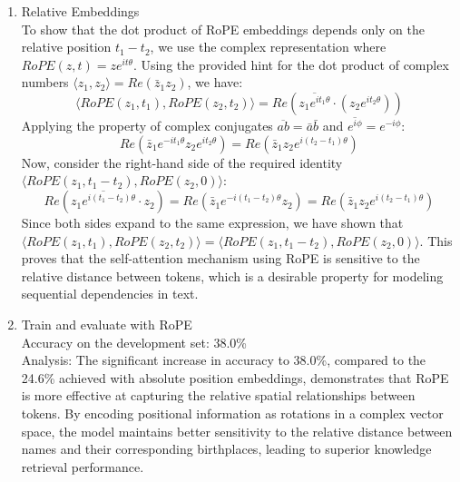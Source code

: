 \documentclass{article}
\begin{document}
\begin{enumerate}
    \item[ii.] Relative Embeddings \\
    To show that the dot product of RoPE embeddings depends only on the relative position $t_1 - t_2$, we use the complex representation where $RoPE(z, t) = z e^{it\theta}$. Using the provided hint for the dot product of complex numbers $\langle z_1, z_2 \rangle = Re(\bar{z}_1 z_2)$, we have:
    \begin{equation}
        \langle RoPE(z_1, t_1), RoPE(z_2, t_2) \rangle = Re\left( \overline{z_1 e^{it_1\theta}} \cdot (z_2 e^{it_2\theta}) \right)
    \end{equation}
    Applying the property of complex conjugates $\overline{ab} = \bar{a}\bar{b}$ and $\overline{e^{i\phi}} = e^{-i\phi}$:
    \begin{equation}
        Re\left( \bar{z}_1 e^{-it_1\theta} z_2 e^{it_2\theta} \right) = Re\left( \bar{z}_1 z_2 e^{i(t_2 - t_1)\theta} \right)
    \end{equation}
    Now, consider the right-hand side of the required identity $\langle RoPE(z_1, t_1 - t_2), RoPE(z_2, 0) \rangle$:
    \begin{equation}
        Re\left( \overline{z_1 e^{i(t_1 - t_2)\theta}} \cdot z_2 \right) = Re\left( \bar{z}_1 e^{-i(t_1 - t_2)\theta} z_2 \right) = Re\left( \bar{z}_1 z_2 e^{i(t_2 - t_1)\theta} \right)
    \end{equation}
    Since both sides expand to the same expression, we have shown that $\langle RoPE(z_1, t_1), RoPE(z_2, t_2) \rangle = \langle RoPE(z_1, t_1 - t_2), RoPE(z_2, 0) \rangle$. This proves that the self-attention mechanism using RoPE is sensitive to the relative distance between tokens, which is a desirable property for modeling sequential dependencies in text.

    \item[iii.] Train and evaluate with RoPE \\
    Accuracy on the development set: 38.0\% \\
    Analysis: The significant increase in accuracy to 38.0\%, compared to the 24.6\% achieved with absolute position embeddings, demonstrates that RoPE is more effective at capturing the relative spatial relationships between tokens. By encoding positional information as rotations in a complex vector space, the model maintains better sensitivity to the relative distance between names and their corresponding birthplaces, leading to superior knowledge retrieval performance.
    
\end{enumerate}
\end{document}
